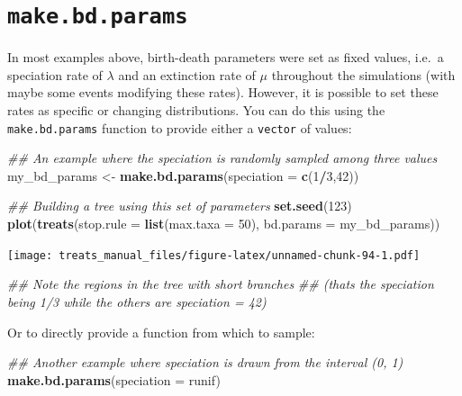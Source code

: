 \documentclass[
]{book}
\newenvironment{Shaded}{\begin{snugshade}}{\end{snugshade}}
\newcommand{\CommentTok}[1]{\textcolor[rgb]{0.56,0.35,0.01}{\textit{#1}}}
\newcommand{\DataTypeTok}[1]{\textcolor[rgb]{0.13,0.29,0.53}{#1}}
\newcommand{\DecValTok}[1]{\textcolor[rgb]{0.00,0.00,0.81}{#1}}
\newcommand{\KeywordTok}[1]{\textcolor[rgb]{0.13,0.29,0.53}{\textbf{#1}}}
\newcommand{\NormalTok}[1]{#1}
\newcommand{\OperatorTok}[1]{\textcolor[rgb]{0.81,0.36,0.00}{\textbf{#1}}}
\newcommand{\StringTok}[1]{\textcolor[rgb]{0.31,0.60,0.02}{#1}}
\begin{document}
\hypertarget{makebdparams}{%
\section{\texorpdfstring{\texttt{make.bd.params}}{make.bd.params}}\label{makebdparams}}

In most examples above, birth-death parameters were set as fixed values, i.e.~a speciation rate of \(\lambda\) and an extinction rate of \(\mu\) throughout the simulations (with maybe some events modifying these rates).
However, it is possible to set these rates as specific or changing distributions.
You can do this using the \texttt{make.bd.params} function to provide either a \texttt{vector} of values:

\begin{Shaded}
\begin{Highlighting}[]
\CommentTok{\#\# An example where the speciation is randomly sampled among three values}
\NormalTok{my\_bd\_params \textless{}{-}}\StringTok{ }\KeywordTok{make.bd.params}\NormalTok{(}\DataTypeTok{speciation =} \KeywordTok{c}\NormalTok{(}\DecValTok{1}\OperatorTok{/}\DecValTok{3}\NormalTok{,}\DecValTok{42}\NormalTok{))}

\CommentTok{\#\# Building a tree using this set of parameters}
\KeywordTok{set.seed}\NormalTok{(}\DecValTok{123}\NormalTok{)}
\KeywordTok{plot}\NormalTok{(}\KeywordTok{treats}\NormalTok{(}\DataTypeTok{stop.rule =} \KeywordTok{list}\NormalTok{(}\DataTypeTok{max.taxa =} \DecValTok{50}\NormalTok{), }\DataTypeTok{bd.params =}\NormalTok{ my\_bd\_params))}
\end{Highlighting}
\end{Shaded}

\texttt{[image: treats\_manual\_files/figure-latex/unnamed-chunk-94-1.pdf]}

\begin{Shaded}
\begin{Highlighting}[]
\CommentTok{\#\# Note the regions in the tree with short branches}
\CommentTok{\#\# (that\textquotesingle{}s the speciation being 1/3 while the others are speciation = 42) }
\end{Highlighting}
\end{Shaded}

Or to directly provide a function from which to sample:

\begin{Shaded}
\begin{Highlighting}[]
\CommentTok{\#\# Another example where speciation is drawn from the interval (0, 1)}
\KeywordTok{make.bd.params}\NormalTok{(}\DataTypeTok{speciation =}\NormalTok{ runif)}
\end{Highlighting}
\end{Shaded}
\end{document}
